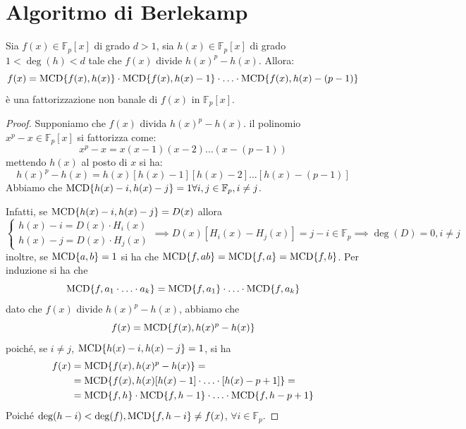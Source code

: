 \documentclass[../main.tex]{subfiles}
\begin{document}
\section{Algoritmo di Berlekamp}
\begin{theorem}
    Sia $f(x) \in \mathbb{F}_p[x]$ di grado $d > 1$, sia $h(x) \in \mathbb{F}_p[x]$ di grado $1 < \deg(h) < d$ tale che $f(x)$ divide $h(x)^p - h(x)$. Allora:
    \begin{equation*}
        f(x) = \operatorname{MCD}\{f(x), h(x)\} \cdot \operatorname{MCD}\{f(x), h(x) - 1\} \cdot \ldots \cdot \operatorname{MCD}\{f(x), h(x) - (p - 1)\}
    \end{equation*}
    è una fattorizzazione non banale di $f(x)$ in $\mathbb{F}_p[x]$.
\end{theorem}
\begin{proof}
    Supponiamo che $f(x)$ divida $h(x)^p - h(x)$. il polinomio $x^p - x \in \mathbb{F}_p[x]$ si fattorizza come:
    \begin{equation*}
        x^p - x = x(x - 1)(x - 2)\ldots(x - (p - 1))
    \end{equation*}
    mettendo $h(x)$ al posto di $x$ si ha:
    \begin{equation*}
        h(x)^p - h(x) = h(x)[h(x) - 1][h(x) - 2]\ldots[h(x) - (p - 1)]
    \end{equation*}
    Abbiamo che $\operatorname{MCD}\{ h(x) - i, h(x) - j\} = 1 \forall i,j \in \mathbb{F}_p, i \neq j$.

    Infatti, se $\operatorname{MCD}\{ h(x) - i, h(x) - j\} = D(x)$ allora
    \begin{equation*}
        \begin{cases}
            h(x) - i = D(x) \cdot H_i(x) \\
            h(x) - j = D(x) \cdot H_j(x)
        \end{cases}
        \implies D(x)[H_i(x) - H_j(x)] = j - i \in \mathbb{F}_p
        \implies \deg(D) = 0, i \neq j
    \end{equation*}
    inoltre, se $ \operatorname{MCD}\{ a, b\} = 1$ si ha che $\operatorname{MCD}\{ f, ab\} = \operatorname{MCD}\{ f, a\} = \operatorname{MCD}\{ f, b\} $. Per induzione si ha che
    \begin{equation*}
        \operatorname{MCD}\{ f, a_1 \cdot \ldots \cdot a_k\} = \operatorname{MCD}\{ f, a_1\} \cdot \ldots \cdot \operatorname{MCD}\{ f, a_k\}
    \end{equation*}
    dato che $f(x)$ divide $h(x)^p - h(x)$, abbiamo che
    \begin{equation*}
        f(x) = \operatorname{MCD}\{ f(x), h(x)^p - h(x)\}
    \end{equation*}
    poiché, se $i \neq j$, $\operatorname{MCD}\{ h(x) - i, h(x) - j\} = 1$, si ha
    \begin{align*}
        f(x) & = \operatorname{MCD}\{ f(x), h(x)^p - h(x)\} =                                                 \\
             & = \operatorname{MCD}\{ f(x), h(x)[h(x) - 1] \cdot \ldots \cdot [h(x) - p + 1]\} =              \\
             & = \operatorname{MCD}\{ f, h\} \cdot \operatorname{MCD}\{ f, h - 1\} \cdot \ldots \cdot \operatorname{MCD}\{ f, h - p + 1\}
    \end{align*}
    Poiché $\deg(h - i) < \deg(f), \operatorname{MCD}\{f, h - i\} \neq f(x)$, $\forall i \in \mathbb{F}_p$.


\end{proof}
\end{document}
